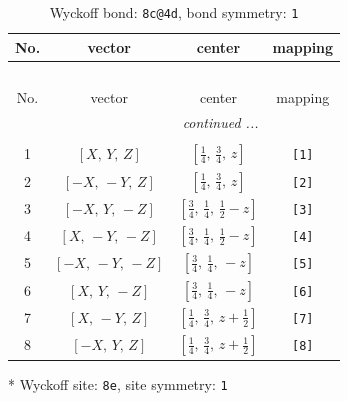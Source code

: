 \documentclass[fleqn,8pt]{jsarticle}
\begin{document}
\renewcommand{\arraystretch}{1.2}
\begin{longtable}{cccc}
\caption{Wyckoff bond: {\tt 8c@4d}, bond symmetry: {\tt 1}}
 \\
 \hline \hline
No. & vector & center & mapping \\ \hline \endfirsthead

\multicolumn{3}{l}{\tablename\ \thetable{}} \\
 \hline \hline
No. & vector & center & mapping \\ \hline \endhead

 \hline \hline
\multicolumn{3}{r}{\footnotesize\it continued ...} \\ \endfoot

 \hline \hline
\multicolumn{3}{r}{} \\ \endlastfoot

1 & $\left[ X,\, Y,\, Z \right]$ & $\left[ \frac{1}{4},\, \frac{3}{4},\, z \right]$ & {\tt [1]} \\ \hline
2 & $\left[ - X,\, - Y,\, Z \right]$ & $\left[ \frac{1}{4},\, \frac{3}{4},\, z \right]$ & {\tt [2]} \\ \hline
3 & $\left[ - X,\, Y,\, - Z \right]$ & $\left[ \frac{3}{4},\, \frac{1}{4},\, \frac{1}{2} - z \right]$ & {\tt [3]} \\ \hline
4 & $\left[ X,\, - Y,\, - Z \right]$ & $\left[ \frac{3}{4},\, \frac{1}{4},\, \frac{1}{2} - z \right]$ & {\tt [4]} \\ \hline
5 & $\left[ - X,\, - Y,\, - Z \right]$ & $\left[ \frac{3}{4},\, \frac{1}{4},\, - z \right]$ & {\tt [5]} \\ \hline
6 & $\left[ X,\, Y,\, - Z \right]$ & $\left[ \frac{3}{4},\, \frac{1}{4},\, - z \right]$ & {\tt [6]} \\ \hline
7 & $\left[ X,\, - Y,\, Z \right]$ & $\left[ \frac{1}{4},\, \frac{3}{4},\, z + \frac{1}{2} \right]$ & {\tt [7]} \\ \hline
8 & $\left[ - X,\, Y,\, Z \right]$ & $\left[ \frac{1}{4},\, \frac{3}{4},\, z + \frac{1}{2} \right]$ & {\tt [8]} \\
\end{longtable}
* Wyckoff site: {\tt 8e}, site symmetry: {\tt 1}
\renewcommand{\arraystretch}{1.2}
\end{document}
